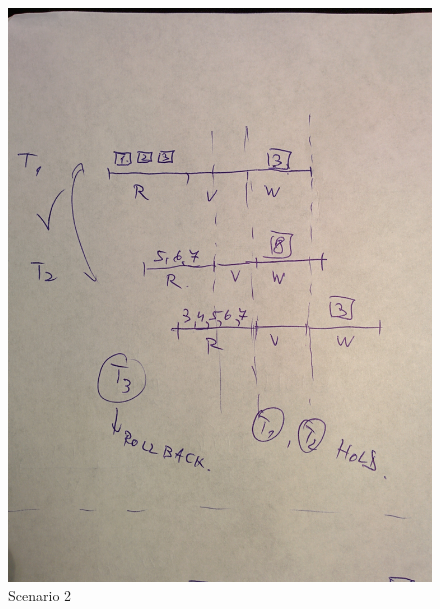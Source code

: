 \documentclass{article}      %
\begin{document}
\begin{figure}[ht!]
\centering
 \includegraphics[scale=.15]{q2-2}
\caption{Scenario 2 \label{overflow}}
\end{figure}
\end{document}

